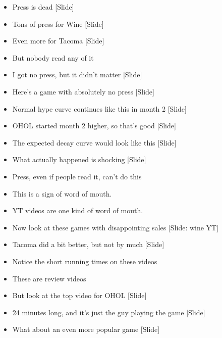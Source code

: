 \documentclass[12pt]{article}
\begin{document}
{\begin{itemize}
\item Press is dead [Slide]

\item Tons of press for Wine [Slide]

\item Even more for Tacoma [Slide]

\item But nobody read any of it

\item I got no press, but it didn't matter [Slide]

\item Here's a game with absolutely no press [Slide]

\item Normal hype curve continues like this in month 2 [Slide]

\item OHOL started month 2 higher, so that's good [Slide]

\item The expected decay curve would look like this [Slide]

\item What actually happened is shocking [Slide]

\item Press, even if people read it, can't do this

\item This is a sign of word of mouth.

\item YT videos are one kind of word of mouth.

\item Now look at these games with disappointing sales [Slide:  wine YT]

\item Tacoma did a bit better, but not by much [Slide]

\item Notice the short running times on these videos

\item These are review videos

\item But look at the top video for OHOL [Slide]

\item 24 minutes long, and it's just the guy playing the game [Slide]

\item What about an even more popular game [Slide]


\end{itemize}}
\end{document}
